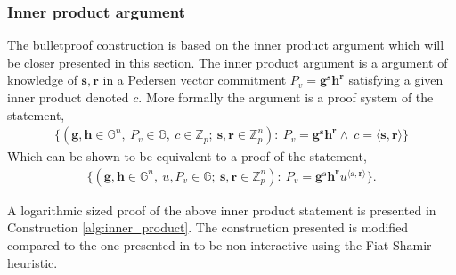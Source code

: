 \subsubsection*{Inner product argument}
\label{sec:inner_prod}
The bulletproof construction is based on the inner product argument which will be closer presented in this section. The inner product argument is a argument of knowledge of $\textbf{s},\mathbf{r}$ in a  Pedersen vector commitment $P_v=\mathbf{g}^\mathbf{s}\mathbf{h}^\mathbf{r}$ satisfying a given inner product denoted $c$. 
More formally the argument is a proof system of the statement,
\begin{align*}
    \{(\mathbf{g},\mathbf{h}\in\mathds{G}^n,\:P_v\in\mathds{G},\:c\in\mathds{Z}_p;\: \mathbf{s},\mathbf{r}\in\mathds{Z}_p^n) : \: P_v=\mathbf{g}^\mathbf{s}\mathbf{h}^\mathbf{r}\wedge\: c =\langle\mathbf{s},\mathbf{r}\rangle\}
\end{align*}
Which can be shown to be equivalent to a proof of the statement,
\begin{align}
\label{eq:IPA}
    \{(\mathbf{g},\mathbf{h}\in\mathds{G}^n,\: u,P_v\in\mathds{G};\: \mathbf{s},\mathbf{r}\in\mathds{Z}_p^n) : \: P_v=\mathbf{g}^\mathbf{s}\mathbf{h}^\mathbf{r}u^{\langle\mathbf{s},\mathbf{r}\rangle}\}.
\end{align}

A logarithmic sized proof of the above inner product statement is presented in Construction \ref{alg:inner_product}. The construction presented is modified compared to the one presented in \cite{bulletProofs_theory} to be non-interactive using the Fiat-Shamir heuristic.

